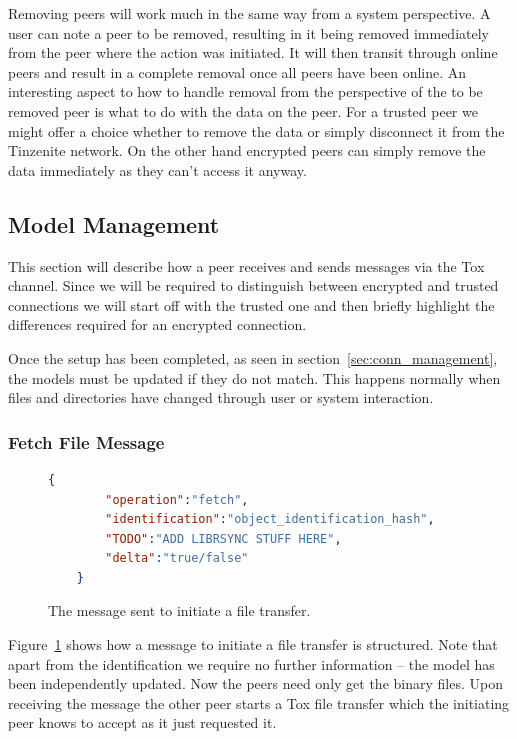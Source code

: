 Removing peers will work much in the same way from a system perspective.
A user can note a peer to be removed, resulting in it being removed immediately from the peer where the action was initiated.
It will then transit through online peers and result in a complete removal once all peers have been online.
An interesting aspect to how to handle removal from the perspective of the to be removed peer is what to do with the data on the peer.
For a trusted peer we might offer a choice whether to remove the data or simply disconnect it from the Tinzenite network.
On the other hand encrypted peers can simply remove the data immediately as they can't access it anyway.

\subsection{Model Management}

This section will describe how a peer receives and sends messages via the Tox channel.
Since we will be required to distinguish between encrypted and trusted connections we will start off with the trusted one and then briefly highlight the differences required for an encrypted connection.

Once the setup has been completed, as seen in section~\ref{sec:conn_management}, the models must be updated if they do not match.
This happens normally when files and directories have changed through user or system interaction.

\subsubsection{Fetch File Message}

\begin{figure}[htp]
    \begin{lstlisting}[language=json,firstnumber=0]
    {
        "operation":"fetch",
        "identification":"object_identification_hash",
        "TODO":"ADD LIBRSYNC STUFF HERE",
        "delta":"true/false"
    }
    \end{lstlisting}
\caption[Fetch Object Message]{The message sent to initiate a file transfer.}
\label{json:fetch_file}
\end{figure}

Figure~\ref{json:fetch_file} shows how a message to initiate a file transfer is structured.
Note that apart from the identification we require no further information – the model has been independently updated.
Now the peers need only get the binary files.
Upon receiving the message the other peer starts a Tox file transfer which the initiating peer knows to accept as it just requested it.

